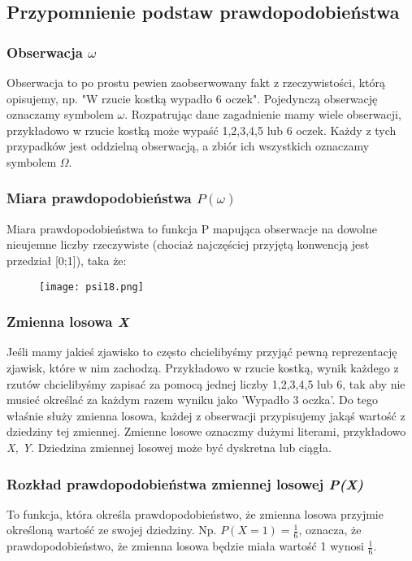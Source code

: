 \documentclass[a4paper,15pt]{article}
\begin{document}
\subsection{Przypomnienie podstaw prawdopodobieństwa}

\subsubsection{Obserwacja $\omega$}
Obserwacja to po prostu pewien zaobserwowany fakt z rzeczywistości, którą opisujemy, np. "W rzucie kostką wypadło 6 oczek". Pojedynczą obserwację oznaczamy symbolem $\omega$. Rozpatrując dane zagadnienie mamy wiele obserwacji, przykładowo w rzucie kostką może wypaść 1,2,3,4,5 lub 6 oczek. Każdy z tych przypadków jest oddzielną obserwacją, a zbiór ich wszystkich oznaczamy symbolem $\Omega$.

\subsubsection{Miara prawdopodobieństwa $P(\omega)$}
Miara prawdopodobieństwa to funkcja P mapująca obserwacje na dowolne nieujemne liczby rzeczywiste (chociaż najczęściej przyjętą konwencją jest przedział [0;1]), taka że:
\begin{figure}[H]
\centerline{\texttt{[image: psi18.png]}}
\end{figure}

\subsubsection{Zmienna losowa \textit{X}}
Jeśli mamy jakieś zjawisko to często chcielibyśmy przyjąć pewną reprezentację zjawisk, które w nim zachodzą. Przykładowo w rzucie kostką, wynik każdego z rzutów chcielibyśmy zapisać za pomocą jednej liczby 1,2,3,4,5 lub 6, tak aby nie musieć określać za każdym razem wyniku jako 'Wypadło 3 oczka'. Do tego właśnie służy zmienna losowa, każdej z  obserwacji przypisujemy jakąś wartość z dziedziny tej zmiennej. Zmienne losowe oznaczmy dużymi literami, przykładowo \textit{X, Y}. Dziedzina zmiennej losowej może być dyskretna lub ciągła. 

\subsubsection{Rozkład prawdopodobieństwa zmiennej losowej \textit{P(X)}}

To funkcja, która określa prawdopodobieństwo, że zmienna losowa przyjmie określoną wartość ze swojej dziedziny. Np. $P(X=1)=\frac{1}{6}$, oznacza, że prawdopodobieństwo, że zmienna losowa będzie miała wartość 1 wynosi $\frac{1}{6}$.
\end{document}
